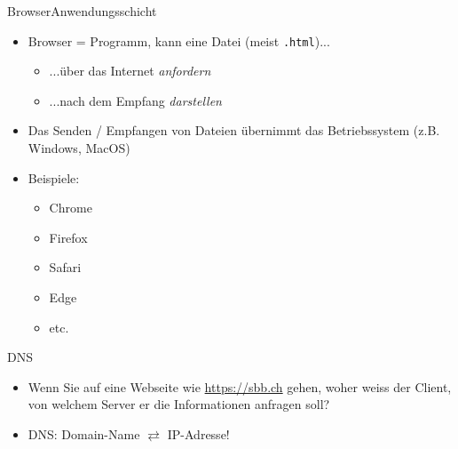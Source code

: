 \begin{frame}[fragile]{\faSafari{} Browser}{Anwendungsschicht}
    \begin{itemize}
        \item Browser = Programm, kann eine Datei (meist \texttt{.html})...
              \begin{itemize}
                  \item ...über das Internet \textit{anfordern}
                  \item ...nach dem Empfang \textit{darstellen}
              \end{itemize}
        \item Das Senden / Empfangen von Dateien übernimmt das Betriebssystem (z.B. Windows, MacOS)
        \item Beispiele:
              \begin{itemize}
                  \item \faChrome{} Chrome
                  \item \faFirefox{} Firefox
                  \item \faSafari{} Safari
                  \item \faEdge{} Edge
                  \item  etc.
              \end{itemize}
    \end{itemize}
\end{frame}

\begin{frame}[fragile]{\acrfull{DNS}}
    \begin{itemize}
        \item Wenn Sie auf eine Webseite wie \url{https://sbb.ch} gehen, woher weiss der Client, von welchem Server er die Informationen anfragen soll?
        \item \gls{DNS}: Domain-Name $\rightleftarrows$ \acrshort{IP}-Adresse!
    \end{itemize}
\end{frame}

